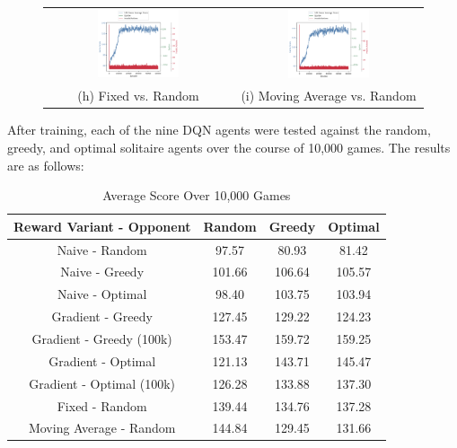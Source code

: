 \documentclass[12pt]{article}
\begin{document}
\begin{figure}[H]
    \begin{tabular}{cc}
        \includegraphics[width=0.45\textwidth]{fixed_random.png} &
        \includegraphics[width=0.45\textwidth]{flex_random.png} \\
        (h) Fixed vs. Random &
        (i) Moving Average vs. Random
    \end{tabular}
\end{figure}

\noindent
After training, each of the nine DQN agents were tested against the random, greedy, and optimal solitaire agents over the course of 10,000 games. The results are as follows:

\begin{table}[H]
    \centering
    \caption*{Average Score Over 10,000 Games}
    \begin{tabular}{ |c|c|c|c| }
        \hline
        Reward Variant - Opponent & Random & Greedy & Optimal \\
        \hline
        Naive - Random & 97.57 & 80.93 & 81.42 \\
        Naive - Greedy & 101.66 & 106.64 & 105.57 \\
        Naive - Optimal & 98.40 & 103.75 & 103.94 \\
        Gradient - Greedy & 127.45 & 129.22 & 124.23 \\
        Gradient - Greedy (100k) & 153.47 & 159.72 & 159.25 \\
        Gradient - Optimal & 121.13 & 143.71 & 145.47 \\
        Gradient - Optimal (100k) & 126.28 & 133.88 & 137.30 \\
        Fixed - Random & 139.44 & 134.76 & 137.28 \\
        Moving Average - Random & 144.84 & 129.45 & 131.66 \\
        \hline
    \end{tabular}
\end{table}
\end{document}
